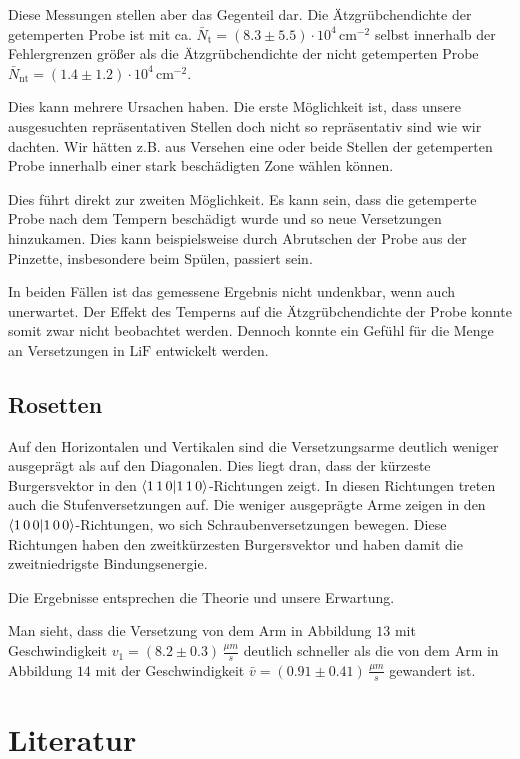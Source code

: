 \documentclass[12pt,a4paper]{scrartcl}
\numberwithin{equation}{section} %
\renewcommand{\[}{} %
\renewcommand{\]}{\noindent} %
\begin{document}
Diese Messungen stellen aber das Gegenteil dar. Die Ätzgrübchendichte
der getemperten Probe ist mit ca.
\(\bar N_\mathrm{t}=(8.3\pm 5.5) \cdot 10^4 \mathrm{\, cm^{-2}}\) selbst
innerhalb der Fehlergrenzen größer als die Ätzgrübchendichte der nicht
getemperten Probe
\(\bar N_\mathrm{nt}=(1.4 \pm 1.2) \cdot 10^4 \mathrm{\, cm^{-2}}\).

Dies kann mehrere Ursachen haben. Die erste Möglichkeit ist, dass unsere
ausgesuchten repräsentativen Stellen doch nicht so repräsentativ sind
wie wir dachten. Wir hätten z.B. aus Versehen eine oder beide Stellen
der getemperten Probe innerhalb einer stark beschädigten Zone wählen
können.

Dies führt direkt zur zweiten Möglichkeit. Es kann sein, dass die
getemperte Probe nach dem Tempern beschädigt wurde und so neue
Versetzungen hinzukamen. Dies kann beispielsweise durch Abrutschen der
Probe aus der Pinzette, insbesondere beim Spülen, passiert sein.

In beiden Fällen ist das gemessene Ergebnis nicht undenkbar, wenn auch
unerwartet. Der Effekt des Temperns auf die Ätzgrübchendichte der Probe
konnte somit zwar nicht beobachtet werden. Dennoch konnte ein Gefühl für
die Menge an Versetzungen in \(\mathrm{LiF}\) entwickelt werden.

\hypertarget{rosetten}{%
\subsection{Rosetten}\label{rosetten}}

Auf den Horizontalen und Vertikalen sind die Versetzungsarme deutlich
weniger ausgeprägt als auf den Diagonalen. Dies liegt dran, dass der
kürzeste Burgersvektor in den \(\braket{1\,1\,0}\)-Richtungen zeigt. In
diesen Richtungen treten auch die Stufenversetzungen auf. Die weniger
ausgeprägte Arme zeigen in den \(\braket{1\,0\,0}\)-Richtungen, wo sich
Schraubenversetzungen bewegen. Diese Richtungen haben den zweitkürzesten
Burgersvektor und haben damit die zweitniedrigste Bindungsenergie.

Die Ergebnisse entsprechen die Theorie und unsere Erwartung.

Man sieht, dass die Versetzung von dem Arm in Abbildung \(13\) mit
Geschwindigkeit \(v_1=(8.2 \pm 0.3) \,\frac{\mu m}{s}\) deutlich
schneller als die von dem Arm in Abbildung \(14\) mit der
Geschwindigkeit \(\bar{v}=(0.91 \pm 0.41) \,\frac{\mu m}{s}\) gewandert
ist.

\hypertarget{literatur}{%
\section{Literatur}\label{literatur}}
\end{document}
